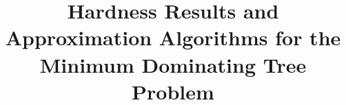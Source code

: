 \title{
Hardness Results and Approximation Algorithms for the Minimum Dominating Tree Problem
}

\date{}